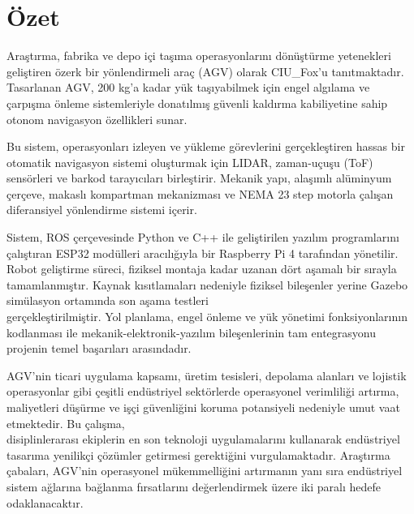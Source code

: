 \documentclass[main]{subfiles}
\begin{document}
\newpage
\centering
\chapter*{\hfil Özet \hfil}
\justifying
Araştırma, fabrika ve depo içi taşıma operasyonlarını dönüştürme yetenekleri geliştiren özerk bir yönlendirmeli araç (AGV) olarak CIU\_Fox'u tanıtmaktadır. 
Tasarlanan AGV, 200 kg'a kadar yük taşıyabilmek için engel algılama ve çarpışma önleme sistemleriyle donatılmış güvenli kaldırma kabiliyetine sahip otonom navigasyon özellikleri sunar.

Bu sistem, operasyonları izleyen ve yükleme görevlerini gerçekleştiren hassas bir otomatik navigasyon sistemi oluşturmak için LIDAR, zaman-uçuşu (ToF) sensörleri ve barkod tarayıcıları birleştirir. 
Mekanik yapı, alaşımlı alüminyum çerçeve, makaslı kompartman mekanizması ve NEMA 23 step motorla çalışan diferansiyel yönlendirme sistemi içerir.

Sistem, ROS çerçevesinde Python ve C++ ile geliştirilen yazılım programlarını çalıştıran ESP32 modülleri aracılığıyla bir Raspberry Pi 4 tarafından yönetilir. 
Robot geliştirme süreci, fiziksel montaja kadar uzanan dört aşamalı bir sırayla tamamlanmıştır. 
Kaynak kısıtlamaları nedeniyle fiziksel bileşenler yerine Gazebo simülasyon ortamında son aşama testleri \\ gerçekleştirilmiştir. 
Yol planlama, engel önleme ve yük yönetimi fonksiyonlarının kodlanması ile mekanik-elektronik-yazılım bileşenlerinin tam entegrasyonu projenin temel başarıları arasındadır.

AGV'nin ticari uygulama kapsamı, üretim tesisleri, depolama alanları ve lojistik operasyonlar gibi çeşitli endüstriyel sektörlerde operasyonel verimliliği artırma, maliyetleri düşürme ve işçi güvenliğini koruma potansiyeli nedeniyle umut vaat etmektedir. 
Bu çalışma,\\ disiplinlerarası ekiplerin en son teknoloji uygulamalarını kullanarak endüstriyel tasarıma yenilikçi çözümler getirmesi gerektiğini vurgulamaktadır. Araştırma çabaları, AGV'nin operasyonel mükemmelliğini artırmanın yanı sıra endüstriyel sistem ağlarına bağlanma fırsatlarını değerlendirmek üzere iki paralı hedefe odaklanacaktır.
\justifying

\newpage
\centering
\tableofcontents
\newpage

\listoffigures
\newpage

\listoftables
\newpage

\listofcodeblocks
\newpage
\end{document}
